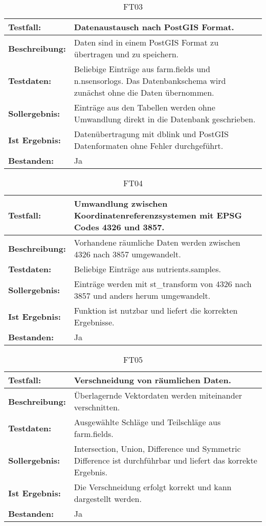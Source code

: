 \begin{table}[h!]
\centering
\small
\begin{tabular}{p{2.8cm}|p{12cm}}
\textbf{Testfall:} & Datenaustausch nach PostGIS Format. \\ \hline
\textbf{Beschreibung:} & Daten sind in einem PostGIS Format zu übertragen und zu speichern. \\ \hline
\textbf{Testdaten:} & Beliebige Einträge aus farm.fields und n.nsensorlogs. Das Datenbankschema wird zunächst ohne die Daten übernommen. \\ \hline
\textbf{Sollergebnis:} & Einträge aus den Tabellen werden ohne Umwandlung direkt in die Datenbank geschrieben. \\ \hline
\textbf{Ist Ergebnis:} & Datenübertragung mit dblink und PostGIS Datenformaten ohne Fehler durchgeführt. \\ \hline
\textbf{Bestanden:} & Ja \\
\end{tabular}
\caption*{FT03}
\end{table}

\begin{table}[h!]
\centering
\small
\begin{tabular}{p{2.8cm}|p{12cm}}
\textbf{Testfall:} & Umwandlung zwischen Koordinatenreferenzsystemen mit EPSG Codes 4326 und 3857. \\ \hline
\textbf{Beschreibung:} & Vorhandene räumliche Daten werden zwischen 4326 nach 3857 umgewandelt. \\ \hline
\textbf{Testdaten:} & Beliebige Einträge aus nutrients.samples. \\ \hline
\textbf{Sollergebnis:} & Einträge werden mit st\_{}transform von 4326 nach 3857 und anders herum umgewandelt. \\ \hline
\textbf{Ist Ergebnis:} & Funktion ist nutzbar und liefert die korrekten Ergebnisse. \\ \hline
\textbf{Bestanden:} & Ja \\
\end{tabular}
\caption*{FT04}
\end{table}

\begin{table}[h!]
\centering
\small
\begin{tabular}{p{2.8cm}|p{12cm}}
\textbf{Testfall:} & Verschneidung von räumlichen Daten. \\ \hline
\textbf{Beschreibung:} & Überlagernde Vektordaten werden miteinander verschnitten. \\ \hline
\textbf{Testdaten:} & Ausgewählte Schläge und Teilschläge aus farm.fields. \\ \hline
\textbf{Sollergebnis:} & Intersection, Union, Difference und Symmetric Difference ist durchführbar und liefert das korrekte Ergebnis. \\ \hline
\textbf{Ist Ergebnis:} & Die Verschneidung erfolgt korrekt und kann dargestellt werden. \\ \hline
\textbf{Bestanden:} & Ja \\
\end{tabular}
\caption*{FT05}
\end{table}

